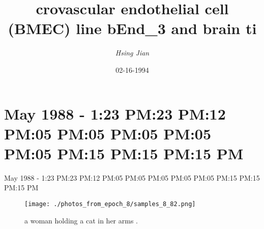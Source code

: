 \documentclass{article}%
\title{crovascular endothelial cell (BMEC) line bEnd\_3 and brain ti}%
\author{\textit{Hsing Jian}}%
\date{02-16-1994}%
\begin{document}
%
\normalsize%
\maketitle%
\section{May 1988 {-} 1:23 PM:23 PM:12 PM:05 PM:05 PM:05 PM:05 PM:05 PM:15 PM:15 PM:15 PM\newline%
}%
\label{sec:May1988{-}123PM123PM212PM305PM305PM405PM505PM605PM615PM715PM815PM}%
May 1988 {-} 1:23 PM:23 PM:12 PM:05 PM:05 PM:05 PM:05 PM:05 PM:15 PM:15 PM:15 PM\newline%

%


\begin{figure}[h!]%
\centering%
\texttt{[image: ./photos\_from\_epoch\_8/samples\_8\_82.png]}%
\caption{a woman holding a cat in her arms .}%
\end{figure}

%
\end{document}
